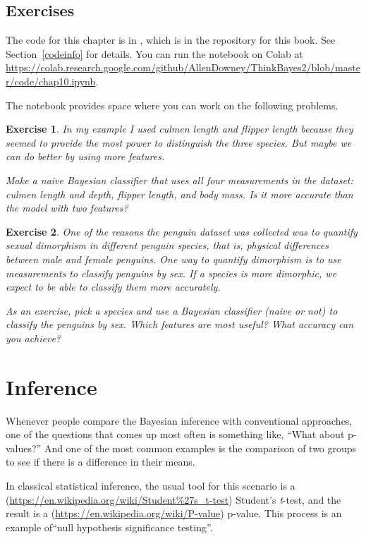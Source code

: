 \documentclass[12pt]{book}
\theoremstyle{exercise}
\newtheorem{exercise}{Exercise}[chapter]
\begin{document}
\section{Exercises}

The code for this chapter is in , which is in the repository for this book.  See Section~\ref{codeinfo} for details.
You can run the notebook on Colab at \url{https://colab.research.google.com/github/AllenDowney/ThinkBayes2/blob/master/code/chap10.ipynb}.

The notebook provides space where you can work on the following problems.

\begin{exercise} In my example I used culmen length and flipper length
because they seemed to provide the most power to distinguish the three
species. But maybe we can do better by using more features.

Make a naive Bayesian classifier that uses all four measurements in the
dataset: culmen length and depth, flipper length, and body mass. Is it
more accurate than the model with two features?

\end{exercise} 


\begin{exercise} 

One of the reasons the penguin dataset was collected
was to quantify sexual dimorphism in different penguin species, that is,
physical differences between male and female penguins. One way to
quantify dimorphism is to use measurements to classify penguins by sex.
If a species is more dimorphic, we expect to be able to classify them
more accurately.

As an exercise, pick a species and use a Bayesian classifier (naive or
not) to classify the penguins by sex. Which features are most useful?
What accuracy can you achieve?
\end{exercise} 


\chapter{Inference}

Whenever people compare the Bayesian inference with conventional
approaches, one of the questions that comes up most often is something
like, ``What about p-values?'' And one of the most common examples is
the comparison of two groups to see if there is a difference in their
means.

In classical statistical inference, the usual tool for this scenario is
a (\url{https://en.wikipedia.org/wiki/Student\%27s_t-test}) Student's
\textit{t}-test, and the result is a
(\url{https://en.wikipedia.org/wiki/P-value}) p-value. This process is
an example of``null
hypothesis significance testing''.
\end{document}
